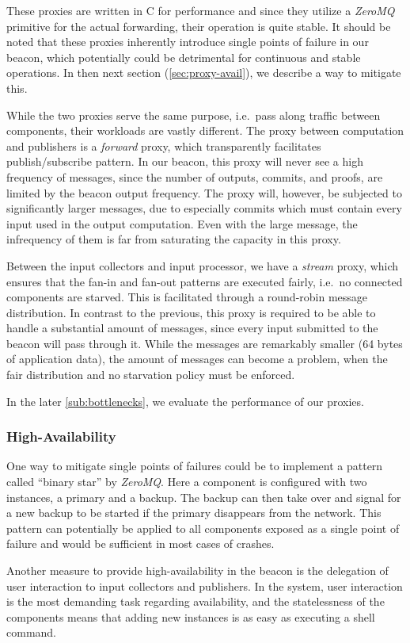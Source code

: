 These proxies are written in C for performance and since they utilize a \textit{ZeroMQ} primitive for the actual forwarding, their operation is quite stable.
It should be noted that these proxies inherently introduce single points of failure in our beacon, which potentially could be detrimental for continuous and stable operations. In then next section (\vref{sec:proxy-avail}), we describe a way to mitigate this.

While the two proxies serve the same purpose, i.e.\ pass along traffic between components, their workloads are vastly different.
The proxy between computation and publishers is a \textit{forward} proxy, which transparently facilitates publish/subscribe pattern.
In our beacon, this proxy will never see a high frequency of messages, since the number of outputs, commits, and proofs, are limited by the beacon output frequency.
The proxy will, however, be subjected to significantly larger messages, due to especially commits which must contain every input used in the output computation. Even with the large message, the infrequency of them is far from saturating the capacity in this proxy.

Between the input collectors and input processor, we have a \textit{stream} proxy, which ensures that the fan-in and fan-out patterns are executed fairly, i.e.\ no connected components are starved.
This is facilitated through a round-robin message distribution.
In contrast to the previous, this proxy is required to be able to handle a substantial amount of messages, since every input submitted to the beacon will pass through it.
While the messages are remarkably smaller (64 bytes of application data), the amount of messages can become a problem, when the fair distribution and no starvation policy must be enforced.

In the later \vref{sub:bottlenecks}, we evaluate the performance of our proxies.

\subsubsection{High-Availability}\label{sec:proxy-avail}
One way to mitigate single points of failures could be to implement a pattern called \enquote{binary star} by \textit{ZeroMQ}.
Here a component is configured with two instances, a primary and a backup.
The backup can then take over and signal for a new backup to be started if the primary disappears from the network.
This pattern can potentially be applied to all components exposed as a single point of failure and would be sufficient in most cases of crashes. 

Another measure to provide high-availability in the beacon is the delegation of user interaction to input collectors and publishers.
In the system, user interaction is the most demanding task regarding availability, and the statelessness of the components means that adding new instances is as easy as executing a shell command.
